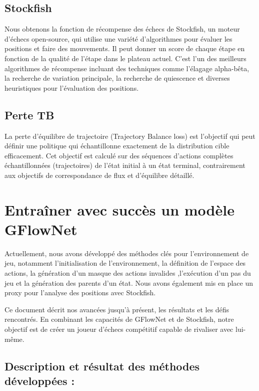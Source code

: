\documentclass[11pt]{article}
\begin{document}
\subsection{Stockfish}
Nous obtenons la fonction de récompense des échecs de Stockfish, un
moteur d'échecs open-source, qui utilise une variété d'algorithmes
pour évaluer les positions et faire des mouvements. Il peut donner un
score de chaque étape en fonction de la qualité de l'étape dans le
plateau actuel. C'est l'un des meilleurs algorithmes de récompense
incluant des techniques comme l'élagage alpha-bêta, la recherche de
variation principale, la recherche de quiescence et diverses
heuristiques pour l'évaluation des positions.

\subsection{Perte TB}
La perte d'équilibre de trajectoire (Trajectory Balance loss) est
l'objectif qui peut définir une politique qui échantillonne exactement
de la distribution cible efficacement. Cet objectif est calculé sur
des séquences d'actions complètes échantillonnées (trajectoires) de
l'état initial à un état terminal, contrairement aux objectifs de
correspondance de flux et d'équilibre détaillé.
\\
\section{Entraîner avec succès un modèle GFlowNet}
Actuellement, nous avons développé des méthodes clés pour
l'environnement de jeu, notamment l'initialisation de l'environnement,
la définition de l'espace des actions, la génération d'un masque des
actions invalides ,l'exécution d'un pas du jeu et la génération des
parents d'un état. Nous avons également mis en place un proxy pour
l'analyse des positions avec Stockfish.

Ce document décrit nos avancées jusqu'à présent, les résultats et les
défis rencontrés. En combinant les capacités de GFlowNet et de
Stockfish, notre objectif est de créer un joueur d'échecs compétitif
capable de rivaliser avec lui-même.
\subsection*{Description et résultat des méthodes développées :}


\end{document}
